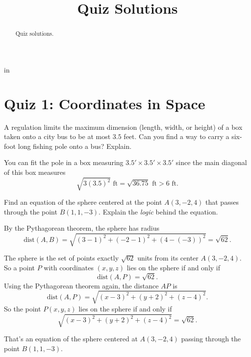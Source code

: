 \documentclass{ximera}
\title{Quiz Solutions}
\newcommand{\pskip}{\vskip 0.1 in}
\begin{document}
\begin{abstract}
Quiz solutions.
\end{abstract}
\maketitle


\pskip

\section*{Quiz 1: Coordinates in Space}

\begin{question}  \label{Q:943r34r34}
A regulation limits the maximum dimension (length, width, or height) of a box taken onto a city bus to be at most $3.5$ feet. Can you find a way to carry a six-foot long fishing pole onto a bus? Explain.

\begin{explanation}
You can fit the pole in a box measuring $3.5'\times 3.5'\times 3.5'$ since the main diagonal of this box measures
\[
      \sqrt{3 (3.5)^2} \text{ ft} = \sqrt{36.75} \text{ ft} > 6 \text{ ft}.
\]
\end{explanation}


\end{question}


\begin{question}  \label{Q:9df33334}
Find an equation of the sphere centered at the point $A(3,-2,4)$ that passes through the point $B(1,1,-3)$. Explain the \emph{logic} behind the equation.

\begin{explanation}
By the Pythagorean theorem, the sphere has radius 
\[
       \text{dist}(A,B) = \sqrt{(3-1)^2 + (-2-1)^2 + (4 - (-3))^2} = \sqrt{62} .
\]

The sphere is the set of points exactly $\sqrt{62}$ units from its center $A(3,-2,4)$. So a point $P$ with coordinates $(x,y,z)$ lies on the sphere if and only if 
\[
  \text{dist} (A,P) = \sqrt{62} .
\]
Using the Pythagorean theorem again, the distance $AP$ is
\[
        \text{dist} (A,P) = \sqrt{(x-3)^2 + (y+2)^2 + (z-4)^2} .
\]
So the point $P(x,y,z)$ lies on the sphere if and only if 
\[
   \sqrt{(x-3)^2 + (y+2)^2 + (z-4)^2} = \sqrt{62}.
\]

That's an equation of the sphere centered at $A(3,-2,4)$ passing through the point $B(1,1,-3)$.

\end{explanation}

\end{question}
\end{document}
